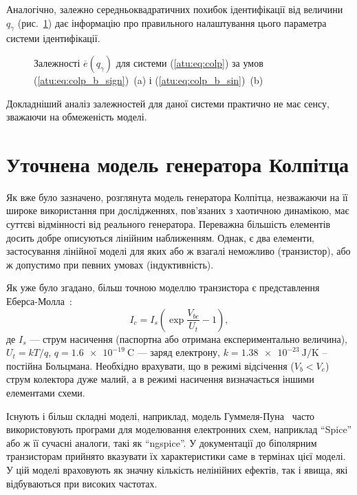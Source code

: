 Аналогічно, залежно середньоквадратичних похибок ідентифікації
від величини
$q_\gamma $ (рис.~\ref{atu:f:colp_e_qgamma}) дає інформацію про правильного
налаштування цього параметра системи ідентифікації.

\begin{figure}[htb!]
  \caption{Залежності  $\overline{e}(q_\gamma)$ для системи (\ref{atu:eq:colp})
  за умов (\ref{atu:eq:colp_b_sign})~(a) і (\ref{atu:eq:colp_b_sin})~(b)
}
\label{atu:f:colp_e_qgamma}
\end{figure}

Докладніший аналіз залежностей для даної системи практично
не має сенсу, зважаючи на обмеженість моделі.




\section{Уточнена модель генератора Колпітца} %

Як вже було зазначено, розглянута модель генератора Колпітца,
незважаючи на її широке використання при дослідженнях,
пов'язаних з хаотичною динамікою, має суттєві відмінності від
реального генератора. Переважна більшість елементів досить
добре описуються лінійним наближенням. Однак, є два елементи,
застосування лінійної моделі для яких або ж взагалі неможливо
(транзистор), або ж допустимо при певних умовах (індуктивність).

Як уже було згадано, більш точною моделлю транзистора є представлення
Еберса-Молла~\cite{horowitz}:
%
\begin{equation}
  I_c = I_s \left( \exp\frac{V_{be}}{U_t} - 1 \right),
  \label{atu:eq:ebers-moll}
\end{equation}
%
де
$I_s $ --- струм насичення (паспортна або отримана експериментально величина),
$U_t=kT/q$,
$q = \SI{1.6e-19}{\coulomb}$ --- заряд електрону,
$k = \SI{1.38e-23}{\joule/\kelvin}$ --
постійна Больцмана.
Необхідно врахувати, що в режимі відсічення ($ V_b <V_e $)
струм колектора дуже малий, а в режимі насичення
визначається іншими елементами схеми.

Існують і більш складні моделі, наприклад, модель
Гуммеля-Пуна~\cite{gummel_poon_1970,shiskin_electronnie_pribori} часто використовують
програми для моделювання електронних схем, наприклад ``Spice'' або ж її сучасні аналоги,
такі як ``ngspice''. У документації до
біполярним транзисторам прийнято вказувати їх характеристики
саме в термінах цієї моделі. У цій моделі враховують як значну
кількість нелінійних ефектів, так і явища, які відбуваються
при високих частотах.

